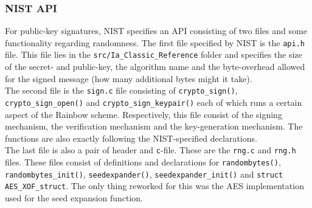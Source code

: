 \subsubsection{NIST API}
For public-key signatures, NIST specifies an API consisting of two files and some functionality regarding randomness. The first file specified by NIST is the \texttt{api.h} file. This file lies in the \texttt{src/Ia\_Classic\_Reference} folder and specifies the size of the secret- and public-key, the algorithm name and the byte-overhead allowed for the signed message (how many additional bytes might it take).
\medskip\\
The second file is the \texttt{sign.c} file consisting of \texttt{crypto\_sign()}, \texttt{crypto\_sign\_open()} and \texttt{crypto\_sign\_keypair()} each of which runs a certain aspect of the Rainbow scheme. Respectively, this file consist of the signing mechanism, the verification mechanism and the key-generation mechanism. The functions are also exactly following the NIST-specified declarations.
\medskip\\
The last file is also a pair of header and \texttt{c}-file. These are the \texttt{rng.c} and \texttt{rng.h} files. These files consist of definitions and declarations for \texttt{randombytes()}, \texttt{randombytes\_init()}, \texttt{seedexpander()}, \texttt{seedexpander\_init()} and \texttt{struct AES\_XOF\_struct}. The only thing reworked for this was the AES implementation used for the seed expansion function.
